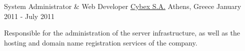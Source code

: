 \begin{cventries}
  \cventry
        {System Administrator \& Web Developer}
        {\href{http://www.cybex.gr/}{Cybex S.A.}}
    {Athens, Greece}
    {January 2011 - July 2011}
		{
      \begin{cvitems}
      \item {Responsible for the administration of the server infrastructure,
          as well as the hosting and domain name registration services of the
          company.}
      \end{cvitems}
        }

\end{cventries}
